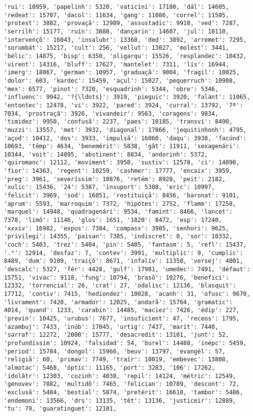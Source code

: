 \begin{Verbatim}[commandchars=\\\{\}]
'rui': 10959, 'papelinh': 5320, 'vaticíni': 17180, 'dál': 14605, 'redeat': 15707, 'dacol': 11634, 'gang': 11086, 'correl': 11505, 'protest': 3882, 'provaçã': 12989, 'assustadic': 9910, 'ved': 7287, 'serrilh': 15177, 'ruín': 3888, 'dançarin': 14607, 'jul': 10110, 'intervençõ': 16043, 'insalubr': 13368, 'ded': 3892, 'arremet': 7295, 'sorumbát': 15217, 'cult': 256, 'vellut': 13027, 'molést': 3441, 'bélic': 14875, 'bisp': 6350, 'oligarqu': 15526, 'resplandec': 10432, 'virent': 14316, 'bluff': 17627, 'mantelet': 7311, 'lís': 16944, 'imerg': 18067, 'german': 10957, 'graduaçã': 9004, 'fragil': 10025, 'dolor': 603, 'kardec': 15459, 'açul': 15027, 'pequerruch': 10908, 'mex': 6577, 'pinot': 7320, 'esquadrinh': 5344, 'obre': 5346, 'influenc': 9942, '?{\ldots}': 3919, 'pieguic': 3920, 'falant': 11065, 'entontec': 12478, 'vi': 3922, 'pared': 3924, 'curral': 13792, '7ª': 7034, 'prostraçã': 3926, 'vivandeir': 9563, 'coragens': 9834, 'timidez': 9950, 'confusã': 2237, 'paes': 10185, 'transvi': 8490, 'muzzi': 13557, 'met': 3932, 'diagonal': 17866, 'jequitinhonh': 4795, 'açod': 10412, 'dos': 3933, 'impulsã': 16060, 'daqu': 3938, 'facúnd': 10693, 'têmp': 4634, 'benemérit': 5838, 'gât': 11911, 'sexagenári': 10344, 'voit': 14895, 'abstinent': 8834, 'andorinh': 5372, 'quiromanc': 12112, 'moviment': 3950, 'sustiv': 12578, 'ci': 14090, 'fior': 14363, 'regent': 10259, 'cashmer': 17777, 'encaix': 3959, 'preg': 3961, 'severíssim': 10876, 'retém': 8928, 'peit': 2182, 'xulic': 15436, '24': 5387, 'insuport': 5388, 'eric': 10997, 'felicit': 3969, 'sod': 16051, 'restituiçã': 8456, 'baronat': 9101, 'aprum': 5593, 'marroquim': 7372, 'hipótes': 2752, 'flamm': 17258, 'marquel': 14948, 'quadragenári': 9534, 'famint': 8466, 'lancet': 7378, 'limõ': 11146, 'glos': 1651, '1820': 8472, 'esp': 17240, 'xxxiv': 16982, 'expus': 7384, 'compass': 3985, 'senhori': 9625, 'privilegi': 14355, 'paisan': 7385, 'indiscret': 0, 'sor': 10332, 'coch': 5403, 'trez': 5404, 'pin': 5405, 'fantasm': 5, 'refl': 15437, '.°': 12914, 'desfaz': 7, 'contev': 3991, 'multiplic': 9, 'cumplic': 8489, 'dum': 9109, 'traiçõ': 8671, 'infalív': 11358, 'versej': 4001, 'descalc': 5327, 'fér': 4428, 'gulf': 17981, 'umedec': 7491, 'défaut': 15751, 'vivac': 9118, 'fung': 10794, 'brasõ': 10276, 'benefici': 12332, 'torrencial': 26, 'crat': 27, 'odalisc': 12136, 'blasquit': 17712, 'contiv': 7415, 'hediondez': 10028, 'acanh': 31, 'ofusc': 9670, 'livrament': 7420, 'armador': 12025, 'andarã': 15764, 'gramatic': 4014, 'quand': 1233, 'carabin': 14485, 'maciez': 7426, 'édip': 227, 'previn': 10425, 'urubus': 7677, 'insuficient': 47, 'receos': 1795, 'azambuj': 7433, 'inúb': 17045, 'urtig': 7437, 'marít': 7440, 'sarraf': 12272, '2000': 15777, 'desacredit': 13101, 'junt': 52, 'profundíssim': 10924, 'falsidad': 54, 'burel': 14488, 'inépc': 5459, 'period': 15784, 'dongol': 15966, 'beuv': 13797, 'evangél': 57, 'religiã': 60, 'primav': 7749, 'traír': 10019, 'embevec': 13808, 'almotac': 5468, 'óptic': 11165, 'port': 3283, '106': 17262, 'idolâtr': 12303, 'cozinh': 4038, 'repil': 14124, 'métric': 12549, 'genovev': 7882, 'multidõ': 7465, 'felician': 10789, 'descont': 72, 'exclusã': 5484, 'bestial': 5874, 'pretérit': 16618, 'tambor': 5486, 'endemoni': 13566, 'drs': 13135, 'têt': 13136, 'justiceir': 12889, 'tu': 79, 'guaratinguet': 12101, 
\end{Verbatim}
